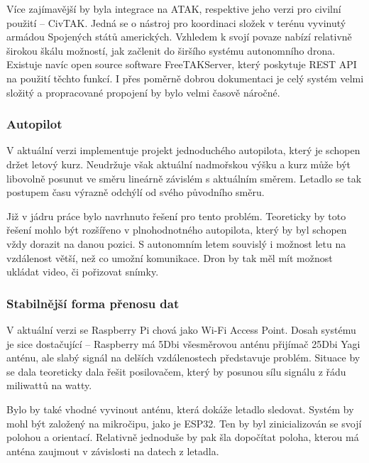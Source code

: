 \documentclass[a4paper,oneside,12pt]{report}
\let\openright=\clearpage
\begin{document}
Více zajímavější by byla integrace na ATAK, respektive jeho verzi pro civilní použití -- CivTAK.
Jedná se o nástroj pro koordinaci složek v terénu vyvinutý armádou Spojených států amerických.
Vzhledem k svojí povaze nabízí relativně širokou škálu možností, jak začlenit do širšího systému autonomního drona.
Existuje navíc open source software FreeTAKServer, který poskytuje REST API na použití těchto funkcí.
I přes poměrně dobrou dokumentaci je celý systém velmi složitý a propracované propojení by bylo velmi časově náročné.

\subsection{Autopilot}

V aktuální verzi implementuje projekt jednoduchého autopilota, který je schopen držet letový kurz.
Neudržuje však aktuální nadmořskou výšku a kurz může být libovolně posunut ve směru lineárně závislém s aktuálním směrem.
Letadlo se tak postupem času výrazně odchýlí od svého původního směru.

Již v jádru práce bylo navrhnuto řešení pro tento problém.
Teoreticky by toto řešení mohlo být rozšířeno v plnohodnotného autopilota, který by byl schopen vždy dorazit na danou pozici.
S autonomním letem souvislý i možnost letu na vzdálenost větší, než co umožní komunikace.
Dron by tak měl mít možnost ukládat video, či pořizovat snímky.

\subsection{Stabilnější forma přenosu dat}

V aktuální verzi se Raspberry Pi chová jako Wi-Fi Access Point.
Dosah systému je sice dostačující -- Raspberry má 5Dbi všesměrovou anténu přijímač 25Dbi Yagi anténu, ale slabý signál na delších vzdálenostech představuje problém.
Situace by se dala teoreticky dala řešit posilovačem, který by posunou sílu signálu z řádu miliwattů na watty.

Bylo by také vhodné vyvinout anténu, která dokáže letadlo sledovat.
Systém by mohl být založený na mikročipu, jako je ESP32.
Ten by byl zinicializován se svojí polohou a orientací.
Relativně jednoduše by pak šla dopočítat poloha, kterou má anténa zaujmout v závislosti na datech z letadla.

\chapter*{}
\setcounter{page}{5} %





\listoffigures
\openright
\end{document}
